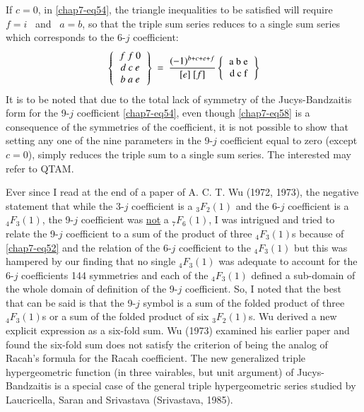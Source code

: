 If $c=0$, in \eqref{chap7-eq54}, the triangle inequalities to be satisfied will require \ $f=i$ \ and \ $a=b$, so that the triple sum series reduces to a single sum series which corresponds to the 6-$j$ coefficient:
\begin{equation}
\left\{
\begin{tabular}{c}
$f \ f \ 0$\\  
$d \ c\ e$\\ 
$b \ a \ e$\\ 
\end{tabular} 
\right\} \
=\ \frac{(-1)^{b+c+e+f}}{[e]\ [f]}
\left\{
\begin{tabular} {c} 
a\ b\ e\\ 
d\ c\ f \\ 
\end{tabular} 
\right\} \label{chap7-eq58}
\end{equation}
It is to be noted that due to the total lack of symmetry of the Jucys-Bandzaitis form for the 9-$j$ coefficient \eqref{chap7-eq54}, even though \eqref{chap7-eq58} is a consequence of the symmetries of the coefficient, it is not possible to show that setting any one of the nine parameters in the 9-$j$ coefficient equal to zero (except $c=0$), simply reduces the triple sum to a single sum series. The interested may refer to QTAM.

Ever since I read at the end of a paper of A. C. T. Wu (1972, 1973), the negative statement that while the 3-$j$ coefficient is a $_3F_2(1)$ and the 6-$j$ coefficient is a $_4F_3(1)$, the 9-$j$ coefficient was \underline{not} a $_7F_6(1)$, I was intrigued and tried to relate the 9-$j$ coefficient to a sum of the product of three $_4F_3(1)$s because of \eqref{chap7-eq52} and the relation of the 6-$j$ coefficient to the $_4F_3(1)$ but this was hampered by our finding that no single $_4F_3(1)$ was adequate to account for the 6-$j$ coefficients 144 symmetries and each of the $_4F_3(1)$ defined a sub-domain of the whole domain of definition of the  9-$j$ coefficient. So, I noted that the best that can be said is that the 9-$j$ symbol is a sum of the folded product of three $_4F_3(1)$s or a sum of the folded product of six $_3F_2(1)$s. Wu derived a new explicit expression as a six-fold sum. Wu (1973) examined his earlier paper and found the six-fold sum does not satisfy the criterion of being the analog of Racah's formula for the Racah coefficient. The new generalized triple hypergeometric function (in three vairables, but unit argument) of Jucys-Bandzaitis is a special case of the general triple hypergeometric series studied by Laucricella, Saran and Srivastava (Srivastava, 1985).

